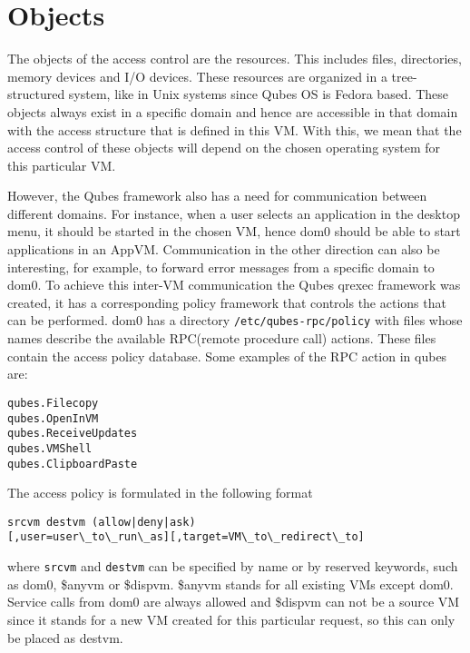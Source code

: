 \documentclass[runningheads,a4paper]{article}
\begin{document}
\section{Objects}

The objects of the access control are the resources. This includes
files, directories, memory devices and I/O devices. These resources
are organized in a tree-structured system, like in Unix systems since Qubes OS is Fedora based.
These objects always exist in a specific domain and hence are accessible in
that domain with the access structure that is defined in this VM. With
this, we mean that the access control of these objects will depend on
the chosen operating system for this particular VM. 

However, the Qubes framework also has a need for communication between
different domains. For instance, when a user selects an application in
the desktop menu, it should be started in the chosen VM, hence dom0
should be able to start applications in an AppVM. Communication in the
other direction can also be interesting, for example, to forward error
messages from a specific domain to dom0. To achieve this inter-VM
communication the Qubes qrexec framework was created, it has a
corresponding policy framework that controls the actions that can be
performed. dom0 has a directory \texttt{/etc/qubes-rpc/policy} with
files whose names describe the available RPC(remote procedure call)
actions. These files contain the access policy database. Some examples
of the RPC action in qubes are:
\begin{verbatim}
qubes.Filecopy
qubes.OpenInVM
qubes.ReceiveUpdates
qubes.VMShell
qubes.ClipboardPaste
\end{verbatim} 
The access policy is formulated in the following format
\begin{verbatim}
srcvm destvm (allow|deny|ask)
[,user=user\_to\_run\_as][,target=VM\_to\_redirect\_to]
\end{verbatim}
where \texttt{srcvm} and \texttt{destvm} can be specified by name or
by reserved keywords, such as dom0, \$anyvm or \$dispvm. \$anyvm
stands for all existing VMs except dom0. Service calls
from dom0 are always allowed and \$dispvm can not be a source VM since
it stands for a new VM created for this particular request, so this
can only be placed as destvm.
\end{document}
